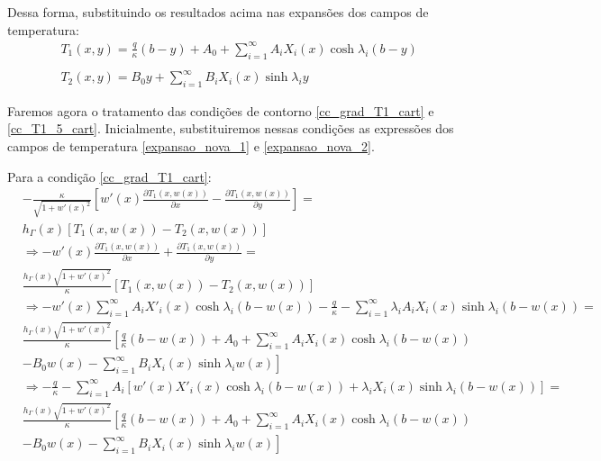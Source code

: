 Dessa forma, substituindo os resultados acima nas expansões dos campos de temperatura:
\begin{align}
	& T_1(x, y) = \frac{q}{\kappa}(b - y) + A_0 + \sum_{i=1}^\infty A_i X_i(x) \cosh\lambda_i (b - y) \label{expansao_nova_1} \\ \nonumber \\
	& T_2(x, y) = B_0 y + \sum_{i=1}^\infty B_i X_i(x)\sinh\lambda_i y \label{expansao_nova_2}
\end{align}

Faremos agora o tratamento das condições de contorno \eqref{cc_grad_T1_cart} e \eqref{cc_T1_5_cart}. Inicialmente, substituiremos
nessas condições as expressões dos campos de temperatura \eqref{expansao_nova_1} e \eqref{expansao_nova_2}.

Para a condição \eqref{cc_grad_T1_cart}:
\begin{align}	
	& -\frac{\kappa}{\sqrt{1 + w'(x)^2}}\left[w'(x)\frac{\partial T_1(x, w(x))}{\partial x} - \frac{\partial T_1(x, w(x))}{\partial y}\right] = \nonumber \\
	& h_\Gamma(x)[T_1(x, w(x))-T_2(x, w(x))] \nonumber \\
	& \Rightarrow - w'(x)\frac{\partial T_1(x, w(x))}{\partial x} + \frac{\partial T_1(x, w(x))}{\partial y} = \nonumber \\
	& \frac{h_\Gamma(x)\sqrt{1 + w'(x)^2}}{\kappa}[T_1(x, w(x))-T_2(x, w(x))] \nonumber \\
	& \Rightarrow
		- w'(x)\sum_{i=1}^\infty A_i X'_i(x) \cosh\lambda_i (b - w(x))
		- \frac{q}{\kappa} - \sum_{i=1}^\infty \lambda_i A_i X_i(x) \sinh\lambda_i (b - w(x)) = \nonumber \\
	& \frac{h_\Gamma(x)\sqrt{1 + w'(x)^2}}{\kappa}\left[
		\frac{q}{\kappa}(b - w(x)) + A_0 + \sum_{i=1}^\infty A_i X_i(x) \cosh\lambda_i (b - w(x)) \right. \nonumber \\
		&\left.
		- B_0 w(x) - \sum_{i=1}^\infty B_i X_i(x)\sinh\lambda_i w(x)\right] \nonumber \\
	& \Rightarrow
		-\frac{q}{\kappa} - 
		\sum_{i=1}^\infty A_i [w'(x)X'_i(x) \cosh\lambda_i (b - w(x))
		+ \lambda_i X_i(x) \sinh\lambda_i (b - w(x))] = \nonumber \\
	& \frac{h_\Gamma(x)\sqrt{1 + w'(x)^2}}{\kappa}\left[
		\frac{q}{\kappa}(b - w(x)) + A_0 + \sum_{i=1}^\infty A_i X_i(x) \cosh\lambda_i (b - w(x)) \right. \nonumber \\
		&\left.
		- B_0 w(x) - \sum_{i=1}^\infty B_i X_i(x)\sinh\lambda_i w(x)\right] \label{constantes_a_b_1}
\end{align}

